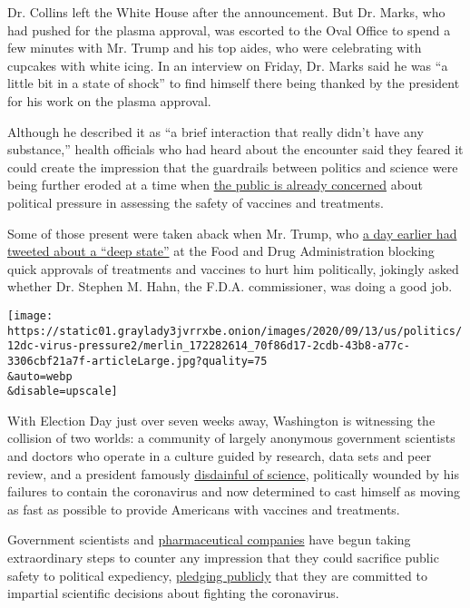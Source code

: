 Dr. Collins left the White House after the announcement. But Dr. Marks,
who had pushed for the plasma approval, was escorted to the Oval Office
to spend a few minutes with Mr. Trump and his top aides, who were
celebrating with cupcakes with white icing. In an interview on Friday,
Dr. Marks said he was ``a little bit in a state of shock'' to find
himself there being thanked by the president for his work on the plasma
approval.

Although he described it as ``a brief interaction that really didn't
have any substance,'' health officials who had heard about the encounter
said they feared it could create the impression that the guardrails
between politics and science were being further eroded at a time when
\href{https://www.kff.org/coronavirus-covid-19/report/kff-health-tracking-poll-september-2020/}{the
public is already concerned} about political pressure in assessing the
safety of vaccines and treatments.

Some of those present were taken aback when Mr. Trump, who
\href{https://twitter.com/realdonaldtrump/status/1297138862108663808?lang=en}{a
day earlier had tweeted about a ``deep state''} at the Food and Drug
Administration blocking quick approvals of treatments and vaccines to
hurt him politically, jokingly asked whether Dr. Stephen M. Hahn, the
F.D.A. commissioner, was doing a good job.

\texttt{[image: https://static01.graylady3jvrrxbe.onion/images/2020/09/13/us/politics/12dc-virus-pressure2/merlin\_172282614\_70f86d17-2cdb-43b8-a77c-3306cbf21a7f-articleLarge.jpg?quality=75\\\&auto=webp\\\&disable=upscale]}

With Election Day just over seven weeks away, Washington is witnessing
the collision of two worlds: a community of largely anonymous government
scientists and doctors who operate in a culture guided by research, data
sets and peer review, and a president famously
\href{https://www.nytimes3xbfgragh.onion/2020/04/28/climate/trump-coronavirus-climate-science.html}{disdainful
of science}, politically wounded by his failures to contain the
coronavirus and now determined to cast himself as moving as fast as
possible to provide Americans with vaccines and treatments.

Government scientists and
\href{https://www.nytimes3xbfgragh.onion/2020/09/08/health/9-drug-companies-pledge-coronavirus-vaccine.html}{pharmaceutical
companies} have begun taking extraordinary steps to counter any
impression that they could sacrifice public safety to political
expediency,
\href{https://www.usatoday.com/story/opinion/2020/09/10/sound-science-to-meet-covid-challenges-fda-career-officials-column/5756948002/}{pledging
publicly} that they are committed to impartial scientific decisions
about fighting the coronavirus.

